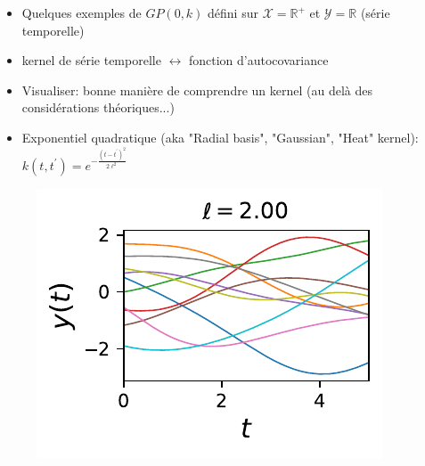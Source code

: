 \documentclass[xcolor=svgnames, t]{beamer}
\begin{document}
\begin{frame}{\subsecname}
  
  \begin{itemize}
    \item Quelques exemples de $GP(0, k)$ défini sur $\mathcal{X} = \mathbb{R}^+$ et $\mathcal{Y} = \mathbb{R}$
    (série temporelle)
    \item kernel de série temporelle $\leftrightarrow$ fonction d'autocovariance
    \item Visualiser: bonne manière de comprendre un kernel (au delà des considérations théoriques...)
  \end{itemize}  
\end{frame}

\begin{frame}{\subsecname}
  
  \begin{itemize}
    \item Exponentiel quadratique (aka "Radial basis", "Gaussian", "Heat" kernel):
    $k (t, t^\prime) = e^{- \frac{(t - t^\prime)^2}{2 \ell^2} }$
  \end{itemize}
  \begin{figure}
    \includegraphics{10_gp_time_SquaredExponentialKernel_2.00.pdf}
  \end{figure}
\end{frame}
\end{document}
